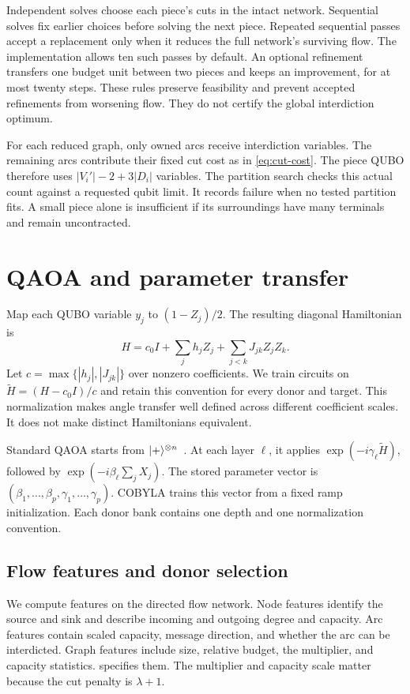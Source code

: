 \documentclass[review,onefignum,onetabnum]{siamart171218}
\begin{document}
Independent solves choose each piece's cuts in the intact network.
Sequential solves fix earlier choices before solving the next piece.
Repeated sequential passes accept a replacement only when it reduces the full network's surviving flow.
The implementation allows ten such passes by default.
An optional refinement transfers one budget unit between two pieces and keeps an improvement, for at most twenty steps.
These rules preserve feasibility and prevent accepted refinements from worsening flow.
They do not certify the global interdiction optimum.

For each reduced graph, only owned arcs receive interdiction variables.
The remaining arcs contribute their fixed cut cost as in \cref{eq:cut-cost}.
The piece QUBO therefore uses $|V_i'|-2+3|D_i|$ variables.
The partition search checks this actual count against a requested qubit limit.
It records failure when no tested partition fits.
A small piece alone is insufficient if its surroundings have many terminals and remain uncontracted.

\section{QAOA and parameter transfer}\label{sec:qaoa}
Map each QUBO variable $y_j$ to $(1-Z_j)/2$.
The resulting diagonal Hamiltonian is
\begin{equation}\label{eq:ising}
 H=c_0 I+\sum_j h_jZ_j+\sum_{j<k}J_{jk}Z_jZ_k.
\end{equation}
Let $c=\max\{|h_j|,|J_{jk}|\}$ over nonzero coefficients.
We train circuits on $\widetilde H=(H-c_0I)/c$ and retain this convention for every donor and target.
This normalization makes angle transfer well defined across different coefficient scales.
It does not make distinct Hamiltonians equivalent.

Standard QAOA starts from $\lvert +\rangle^{\otimes n}$~\cite{farhi2014}.
At each layer $\ell$, it applies $\exp(-i\gamma_\ell\widetilde H)$, followed by $\exp(-i\beta_\ell\sum_jX_j)$.
The stored parameter vector is $(\beta_1,\ldots,\beta_p,\gamma_1,\ldots,\gamma_p)$.
COBYLA trains this vector from a fixed ramp initialization.
Each donor bank contains one depth and one normalization convention.

\subsection{Flow features and donor selection}
We compute features on the directed flow network.
Node features identify the source and sink and describe incoming and outgoing degree and capacity.
Arc features contain scaled capacity, message direction, and whether the arc can be interdicted.
Graph features include size, relative budget, the multiplier, and capacity statistics.
 specifies them.
The multiplier and capacity scale matter because the cut penalty is $\lambda+1$.
\end{document}
